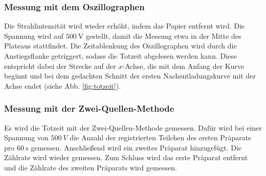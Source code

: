 \subsubsection{Messung mit dem Oszillographen}
Die Strahlintensität wird wieder erhöht, indem das Papier entfernt wird.
Die Spannung wird auf $\SI{500}{\volt}$ gestellt, damit die Messung etwa in der Mitte des Plateaus stattfindet.
Die Zeitablenkung des Oszillographen wird durch die Anstiegsflanke getriggert, sodass die Totzeit abgelesen werden kann. Diese entspricht dabei der Strecke auf der $x$-Achse, die mit dem Anfang der Kurve beginnt und bei dem gedachten Schnitt der ersten Nachentladungskurve mit der Achse endet (siehe Abb. \ref{fig:totzeit}).

\subsubsection{Messung mit der Zwei-Quellen-Methode}
Es wird die Totzeit mit der Zwei-Quellen-Methode gemessen. Dafür wird bei einer Spannung von $\SI{500}{V}$ die Anzahl der registrierten Teilchen des ersten Präparats pro $\SI{60}{\second}$ gemessen. Anschließend wird ein zweites Präparat hinzugefügt. Die Zählrate wird wieder gemessen. Zum Schluss wird das erste Präparat entfernt und die Zählrate des zweiten Präparats wird gemessen.